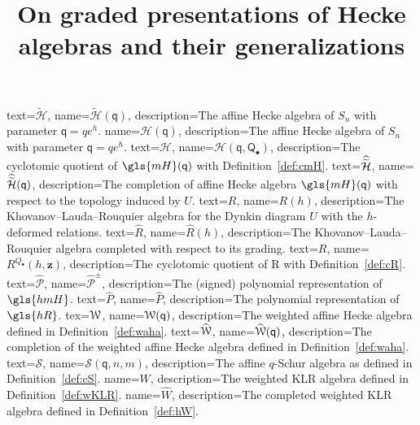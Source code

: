 \documentclass[ALCO,ThmDefs,Unicode,epreuves]{cedram}
\author{\firstname{Ben} \lastname{Webster}}
\title[On graded presentations of Hecke algebras and their generalizations]{On graded presentations of Hecke algebras and their generalizations}
\newcommand{\Bz}{\mathbf{z}}
\newcommand{\pq}{\mathsf{q}}
\newcommand{\PQ}{\mathsf{Q}}
\newcommand{\cP}{\mathcal{P}}
\newcommand{\hmH}{\gls{hmH}}
\begin{document}
 {
  text={\ensuremath{\mathcal{\widetilde{H}}}},
  name={\ensuremath{\mathcal{\widetilde{H}}(\pq)}},
   description={The affine Hecke algebra of $S_n$ with parameter $\pq=qe^h$.}
 }
  {
  name={\ensuremath{\mathcal{H}(\pq)}},
   description={The affine Hecke algebra of $S_n$ with parameter $\pq=qe^h$.}
 }
  {
  text={\ensuremath{\mathcal{H}}},
  name={\ensuremath{\mathcal{H}(\pq,\PQ_\bullet)}},
   description={The cyclotomic quotient of $\gls{mH}(\pq)$ with Definition~\ref{def:cmH}.}
 }
   {
  text={\ensuremath{\widehat{\widetilde{\mkern0mu\mathcal{H}}}}},
  name={\ensuremath{\widehat{\widetilde{\mkern0mu\mathcal{H}}}(\pq)}},
   description={The completion of affine Hecke algebra $\gls{mH}(\pq)$
   with respect to the topology induced by $U$.}
 }
   {
  text={\ensuremath{{R}}},
  name={\ensuremath{{R}(h)}},
   description={The Khovanov--Lauda--Rouquier algebra for the Dynkin
  diagram $U$ with the $h$-deformed relations.}
 }
    {
  text={\ensuremath{\widehat{R}}},
  name={\ensuremath{\widehat{R}(h)}},
   description={The Khovanov--Lauda--Rouquier algebra completed with
  respect to its grading.}
 }
    {
  text={\ensuremath{{R}}},
  name={\ensuremath{{R}^{Q_\bullet}(h,\Bz)}},
   description={The cyclotomic quotient of \gls{R} with Definition~\ref{def:cR}.}
 }
    {
  text={\ensuremath{\widehat{\cP}}},
  name={\ensuremath{\widehat{\cP}^\pm}},
   description={The (signed) polynomial representation of $\hmH$.}
 }
     {
  text={\ensuremath{\widehat{P}}},
  name={\ensuremath{\widehat{P}}},
   description={The polynomial representation of $\gls{hR}$.}
 }
      {
  tex={\ensuremath{\EuScript{W}}},
  name={\ensuremath{\EuScript{W}(\pq)}},
   description={The weighted affine Hecke algebra defined in
  Definition~\ref{def:waha}.}
 }
      {
  text={\ensuremath{\widehat{\EuScript{W}}}},
  name={\ensuremath{\widehat{\EuScript{W}}(\pq)}},
  description={The completion of the weighted affine Hecke algebra defined in
  Definition~\ref{def:waha}.}
 }
      {
  text={\ensuremath{\mathcal{S}}},
  name={\ensuremath{\mathcal{S}(\pq,n,m)}},
   description={The affine $q$-Schur algebra as defined in Definition~\ref{def:cS}.}
 }
       {
  name={\ensuremath{{W}}},
   description={The weighted KLR algebra defined in
  Definition~\ref{def:wKLR}.}
 }
       {
  name={\ensuremath{\widehat{W}}},
   description={The completed weighted KLR algebra defined in
  Definition~\ref{def:hW}.}
 }
\end{document}
